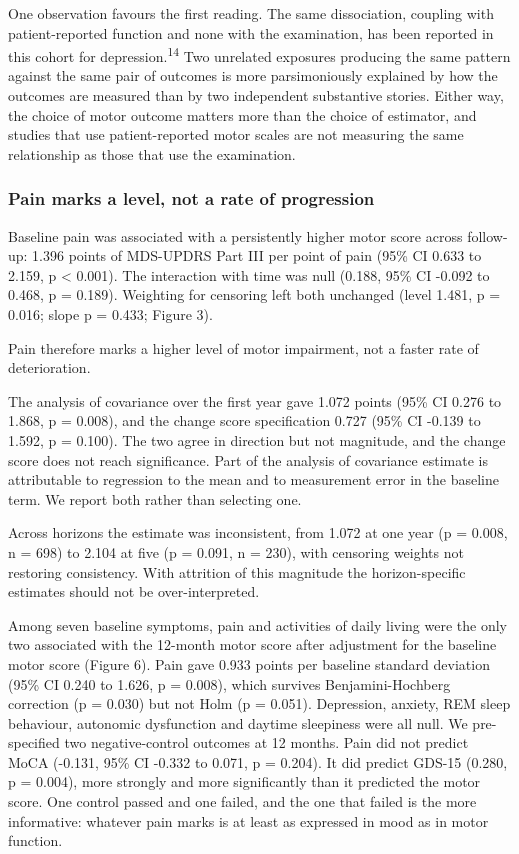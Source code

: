 \documentclass[
  english,
  12pt,
]{article}
\begin{document}
One observation favours the first reading. The same dissociation, coupling with patient-reported function and none with the examination, has been reported in this cohort for depression.\textsuperscript{14} Two unrelated exposures producing the same pattern against the same pair of outcomes is more parsimoniously explained by how the outcomes are measured than by two independent substantive stories. Either way, the choice of motor outcome matters more than the choice of estimator, and studies that use patient-reported motor scales are not measuring the same relationship as those that use the examination.

\subsubsection{Pain marks a level, not a rate of progression}\label{pain-marks-a-level-not-a-rate-of-progression}

Baseline pain was associated with a persistently higher motor score across follow-up: 1.396 points of MDS-UPDRS Part III per point of pain (95\% CI 0.633 to 2.159, p \textless{} 0.001). The interaction with time was null (0.188, 95\% CI -0.092 to 0.468, p = 0.189). Weighting for censoring left both unchanged (level 1.481, p = 0.016; slope p = 0.433; Figure 3).

Pain therefore marks a higher level of motor impairment, not a faster rate of deterioration.

The analysis of covariance over the first year gave 1.072 points (95\% CI 0.276 to 1.868, p = 0.008), and the change score specification 0.727 (95\% CI -0.139 to 1.592, p = 0.100). The two agree in direction but not magnitude, and the change score does not reach significance. Part of the analysis of covariance estimate is attributable to regression to the mean and to measurement error in the baseline term. We report both rather than selecting one.

Across horizons the estimate was inconsistent, from 1.072 at one year (p = 0.008, n = 698) to 2.104 at five (p = 0.091, n = 230), with censoring weights not restoring consistency. With attrition of this magnitude the horizon-specific estimates should not be over-interpreted.

Among seven baseline symptoms, pain and activities of daily living were the only two associated with the 12-month motor score after adjustment for the baseline motor score (Figure 6). Pain gave 0.933 points per baseline standard deviation (95\% CI 0.240 to 1.626, p = 0.008), which survives Benjamini-Hochberg correction (p = 0.030) but not Holm (p = 0.051). Depression, anxiety, REM sleep behaviour, autonomic dysfunction and daytime sleepiness were all null. We pre-specified two negative-control outcomes at 12 months. Pain did not predict MoCA (-0.131, 95\% CI -0.332 to 0.071, p = 0.204). It did predict GDS-15 (0.280, p = 0.004), more strongly and more significantly than it predicted the motor score. One control passed and one failed, and the one that failed is the more informative: whatever pain marks is at least as expressed in mood as in motor function.
\end{document}
